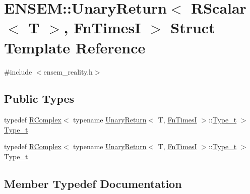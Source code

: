 \hypertarget{structENSEM_1_1UnaryReturn_3_01RScalar_3_01T_01_4_00_01FnTimesI_01_4}{}\section{E\+N\+S\+EM\+:\+:Unary\+Return$<$ R\+Scalar$<$ T $>$, Fn\+TimesI $>$ Struct Template Reference}
\label{structENSEM_1_1UnaryReturn_3_01RScalar_3_01T_01_4_00_01FnTimesI_01_4}


{\ttfamily \#include $<$ensem\+\_\+reality.\+h$>$}

\subsection*{Public Types}
\begin{DoxyCompactItemize}
\item 
typedef \mbox{\hyperlink{classENSEM_1_1RComplex}{R\+Complex}}$<$ typename \mbox{\hyperlink{structENSEM_1_1UnaryReturn}{Unary\+Return}}$<$ T, \mbox{\hyperlink{structENSEM_1_1FnTimesI}{Fn\+TimesI}} $>$\+::\mbox{\hyperlink{structENSEM_1_1UnaryReturn_3_01RScalar_3_01T_01_4_00_01FnTimesI_01_4_ab4ba902ca0b5815b1d94723d80d0b878}{Type\+\_\+t}} $>$ \mbox{\hyperlink{structENSEM_1_1UnaryReturn_3_01RScalar_3_01T_01_4_00_01FnTimesI_01_4_ab4ba902ca0b5815b1d94723d80d0b878}{Type\+\_\+t}}
\item 
typedef \mbox{\hyperlink{classENSEM_1_1RComplex}{R\+Complex}}$<$ typename \mbox{\hyperlink{structENSEM_1_1UnaryReturn}{Unary\+Return}}$<$ T, \mbox{\hyperlink{structENSEM_1_1FnTimesI}{Fn\+TimesI}} $>$\+::\mbox{\hyperlink{structENSEM_1_1UnaryReturn_3_01RScalar_3_01T_01_4_00_01FnTimesI_01_4_ab4ba902ca0b5815b1d94723d80d0b878}{Type\+\_\+t}} $>$ \mbox{\hyperlink{structENSEM_1_1UnaryReturn_3_01RScalar_3_01T_01_4_00_01FnTimesI_01_4_ab4ba902ca0b5815b1d94723d80d0b878}{Type\+\_\+t}}
\end{DoxyCompactItemize}


\subsection{Member Typedef Documentation}
\mbox{\label{structENSEM_1_1UnaryReturn_3_01RScalar_3_01T_01_4_00_01FnTimesI_01_4_ab4ba902ca0b5815b1d94723d80d0b878}} 
